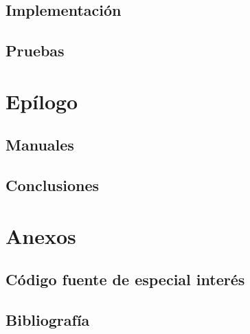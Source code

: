 \documentclass[11pt,a4paper]{book}
\begin{document}
\chapter{Implementación}

\chapter{Pruebas}


\part{Epílogo}

\chapter{Manuales}

\chapter{Conclusiones}

\appendix

\part{Anexos}

\chapter{Código fuente de especial interés}

\chapter{Bibliografía}
\end{document}
